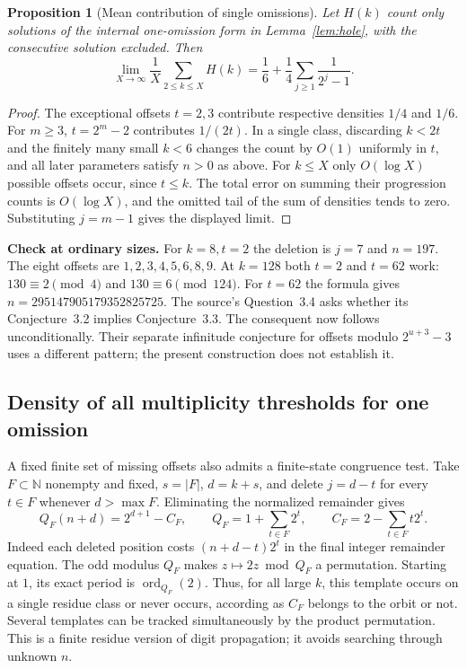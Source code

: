 \documentclass[11pt]{article}
\newtheorem{proposition}[theorem]{Proposition}
\newcommand{\N}{\mathbb{N}}
\begin{document}
\begin{proposition}[Mean contribution of single omissions]
Let $H(k)$ count only solutions of the internal one-omission form
in Lemma~\ref{lem:hole}, with the consecutive solution excluded. Then
\[
 \lim_{X\to\infty}\frac1X\sum_{2\le k\le X}H(k)
   =\frac16+\frac14\sum_{j\ge1}\frac1{2^j-1}.
\]
\end{proposition}
\begin{proof}
The exceptional offsets $t=2,3$ contribute respective densities $1/4$
and $1/6$. For $m\ge3$, $t=2^m-2$ contributes $1/(2t)$.
In a single class, discarding $k<2t$ and the finitely many small
$k<6$ changes the count by $O(1)$ uniformly in $t$, and all later
parameters satisfy $n>0$ as above. For $k\le X$ only $O(\log X)$
possible offsets occur, since $t\le k$. The total error on summing
their progression counts is $O(\log X)$, and the omitted tail of
the sum of densities tends to zero. Substituting $j=m-1$ gives the
displayed limit.
\end{proof}

\noindent\textbf{Check at ordinary sizes.}
For $k=8,t=2$ the deletion is $j=7$ and $n=197$. The eight offsets
are $1,2,3,4,5,6,8,9$. At $k=128$ both $t=2$ and $t=62$ work:
$130\equiv2\pmod4$ and $130\equiv6\pmod{124}$.
For $t=62$ the formula gives $n=295147905179352825725$.
The source's Question~3.4 asks whether its Conjecture~3.2 implies
Conjecture~3.3. The consequent now follows unconditionally. Their
separate infinitude conjecture for offsets modulo $2^{u+3}-3$ uses
a different pattern; the present construction does not establish it.

\subsection{Density of all multiplicity thresholds for one omission}

A fixed finite set of missing offsets also admits a finite-state
congruence test. Take $F\subset\N$ nonempty and fixed, $s=|F|$,
$d=k+s$, and delete $j=d-t$ for every $t\in F$ whenever $d>\max F$.
Eliminating the normalized remainder gives
\[
 Q_F(n+d)=2^{d+1}-C_F,\qquad
 Q_F=1+\sum_{t\in F}2^t,\qquad C_F=2-\sum_{t\in F}t2^t .
\]
Indeed each deleted position costs $(n+d-t)2^t$ in the final integer
remainder equation. The odd modulus $Q_F$ makes
$z\mapsto 2z\bmod Q_F$ a permutation. Starting at $1$, its exact
period is $\operatorname{ord}_{Q_F}(2)$. Thus, for all large $k$,
this template occurs on a single residue class or never occurs, according
as $C_F$ belongs to the orbit or not. Several templates can be tracked
simultaneously by the product permutation. This is a finite residue
version of digit propagation; it avoids searching through unknown $n$.
\end{document}
